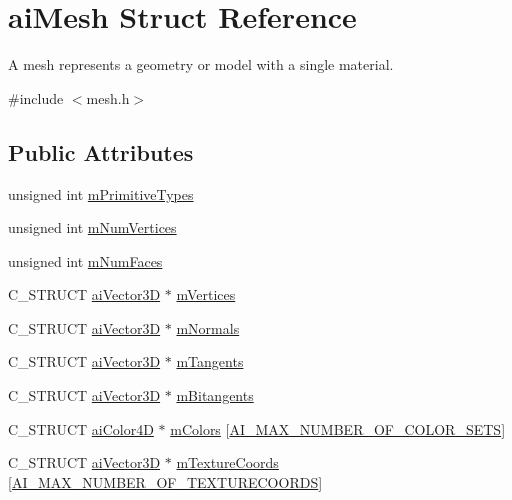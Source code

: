 \hypertarget{structaiMesh}{\section{ai\-Mesh \-Struct \-Reference}
\label{structaiMesh}
}


\-A mesh represents a geometry or model with a single material.  




{\ttfamily \#include $<$mesh.\-h$>$}

\subsection*{\-Public \-Attributes}
\begin{DoxyCompactItemize}
\item 
unsigned int \hyperlink{structaiMesh_a99d66ac0a444068c1b252b30265cbf53}{m\-Primitive\-Types}
\item 
unsigned int \hyperlink{structaiMesh_ab34b7b5941e6636f1c08f615cbb072ef}{m\-Num\-Vertices}
\item 
unsigned int \hyperlink{structaiMesh_aeed22ee6963b79548f3877b3c905518e}{m\-Num\-Faces}
\item 
\-C\-\_\-\-S\-T\-R\-U\-C\-T \hyperlink{structaiVector3D}{ai\-Vector3\-D} $\ast$ \hyperlink{structaiMesh_afd4588abb3e1c72821ae0234a3850662}{m\-Vertices}
\item 
\-C\-\_\-\-S\-T\-R\-U\-C\-T \hyperlink{structaiVector3D}{ai\-Vector3\-D} $\ast$ \hyperlink{structaiMesh_aec81b496b4d93838cef038933dabe9b9}{m\-Normals}
\item 
\-C\-\_\-\-S\-T\-R\-U\-C\-T \hyperlink{structaiVector3D}{ai\-Vector3\-D} $\ast$ \hyperlink{structaiMesh_af367ff78bd69f3e83d7edc8ad67dc5df}{m\-Tangents}
\item 
\-C\-\_\-\-S\-T\-R\-U\-C\-T \hyperlink{structaiVector3D}{ai\-Vector3\-D} $\ast$ \hyperlink{structaiMesh_ab2a81bfe1731f01271ebab274a8f01c4}{m\-Bitangents}
\item 
\-C\-\_\-\-S\-T\-R\-U\-C\-T \hyperlink{structaiColor4D}{ai\-Color4\-D} $\ast$ \hyperlink{structaiMesh_ad9215f67bd0c2277b10775a8adb66b96}{m\-Colors} \mbox{[}\hyperlink{mesh_8h_a74ea1282873ac4b111b48d2380c26bdc}{\-A\-I\-\_\-\-M\-A\-X\-\_\-\-N\-U\-M\-B\-E\-R\-\_\-\-O\-F\-\_\-\-C\-O\-L\-O\-R\-\_\-\-S\-E\-T\-S}\mbox{]}
\item 
\-C\-\_\-\-S\-T\-R\-U\-C\-T \hyperlink{structaiVector3D}{ai\-Vector3\-D} $\ast$ \hyperlink{structaiMesh_a4a50b11d00ef50f419c75cab0f6bddd6}{m\-Texture\-Coords} \mbox{[}\hyperlink{mesh_8h_a335874c5058c7f1e866eb953bf192258}{\-A\-I\-\_\-\-M\-A\-X\-\_\-\-N\-U\-M\-B\-E\-R\-\_\-\-O\-F\-\_\-\-T\-E\-X\-T\-U\-R\-E\-C\-O\-O\-R\-D\-S}\mbox{]}

\end{DoxyCompactItemize}
